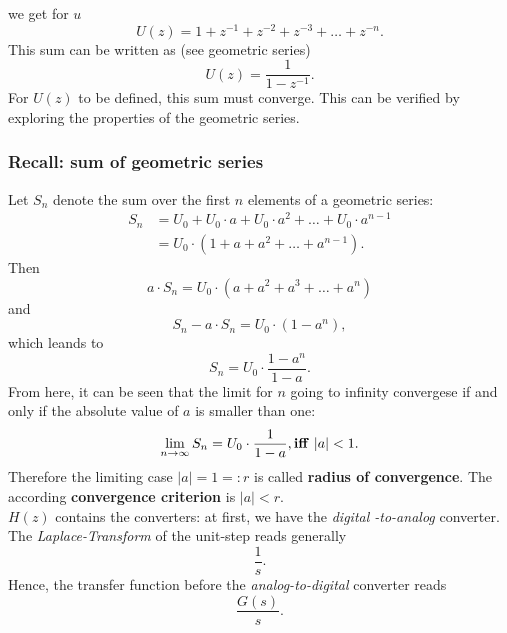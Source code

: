 \documentclass[a4paper,12 pt]{article}
\numberwithin{equation}{section}
\theoremstyle{definition}
\theoremstyle{remark}
\theoremstyle{definition}
\theoremstyle{definition}
\theoremstyle{definition}
\theoremstyle{remark}
\begin{document}
we get for $u$
\begin{equation}
U(z)=1+z^{-1}+z^{-2}+z^{-3}+\hdots+ z^{-n}.
\end{equation}
This sum can be written as (see geometric series)
\begin{equation}
U(z)=\frac{1}{1-z^{-1}}.
\end{equation}
For $U(z)$ to be defined, this sum must converge. This can be verified by exploring the properties of the geometric series.
\subsubsection*{Recall: sum of geometric series}
Let $S_n$ denote the sum over the first $n$ elements of a geometric series:
\begin{equation*}
\begin{split}
S_n&=U_0+U_0\cdot a+U_0\cdot a^2+\hdots+U_0\cdot a^{n-1}\\
&=U_0\cdot (1+a+a^2+\hdots +a^{n-1}).
\end{split}
\end{equation*}
Then
\begin{equation*}
a\cdot S_n=U_0\cdot (a+a^2+a^3+\hdots +a^n)
\end{equation*}
and 
\begin{equation*}
S_n-a\cdot S_n=U_0\cdot (1-a^n),
\end{equation*}
which leands to
\begin{equation*}
S_n=U_0\cdot \frac{1-a^n}{1-a}.
\end{equation*}
From here, it can be seen that the limit for $n$ going to infinity convergese if and only if the absolute value of $a$ is smaller than one:
\begin{equation}
\lim_{n\rightarrow \infty}S_n=U_0\cdot \frac{1}{1-a}, \text{\textbf{iff} } |a|<1. 
\end{equation}
Therefore the limiting case $|a|=1=:r$ is called \textbf{radius of convergence}. The according \textbf{convergence criterion} is $|a|<r$. \\
$H(z)$ contains the converters: at first, we have the \textit{digital -to-analog} converter. The \textit{Laplace-Transform} of the unit-step reads generally
\begin{equation}
\frac{1}{s}.
\end{equation}
Hence, the transfer function before the \textit{analog-to-digital} converter reads
\begin{equation}
\frac{G(s)}{s}.
\end{equation}
\end{document}
